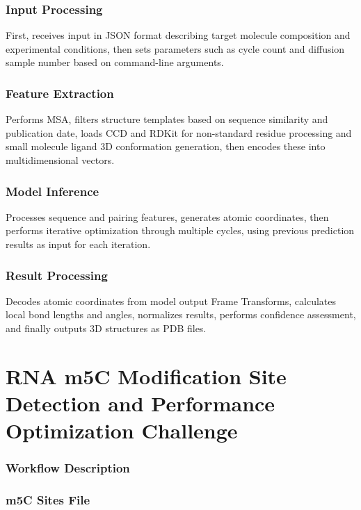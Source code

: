 \documentclass[a4paper,12pt]{article}
\begin{document}
\subsubsection{Input Processing}
First, receives input in JSON format describing target molecule composition and experimental conditions, then sets parameters such as cycle count and diffusion sample number based on command-line arguments.

\subsubsection{Feature Extraction}
Performs MSA, filters structure templates based on sequence similarity and publication date, loads CCD and RDKit for non-standard residue processing and small molecule ligand 3D conformation generation, then encodes these into multidimensional vectors.

\subsubsection{Model Inference}
Processes sequence and pairing features, generates atomic coordinates, then performs iterative optimization through multiple cycles, using previous prediction results as input for each iteration.

\subsubsection{Result Processing}
Decodes atomic coordinates from model output Frame Transforms, calculates local bond lengths and angles, normalizes results, performs confidence assessment, and finally outputs 3D structures as PDB files.

\newpage

\section{RNA m5C Modification Site Detection and Performance Optimization Challenge}

\subsubsection{Workflow Description}

\subsubsection{m5C Sites File}
\end{document}

